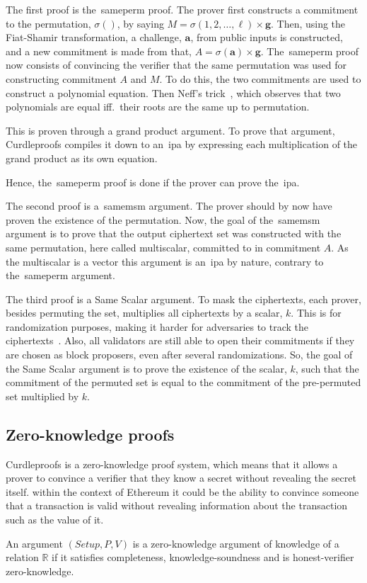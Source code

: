 The first proof is the~\gls{sameperm} proof.
The prover first constructs a commitment to the permutation, $\sigma()$, by saying $M=\sigma(1,2,\dots,\ell)\times\mathbf{g}$.
Then, using the Fiat-Shamir transformation, a challenge, $\mathbf{a}$, from public inputs is constructed, and a new commitment is made from that, $A=\sigma(\mathbf{a})\times\mathbf{g}$.
The~\gls{sameperm} proof now consists of convincing the verifier that the same permutation was used for constructing commitment $A$ and $M$.
To do this, the two commitments are used to construct a polynomial equation.
Then Neff's trick~\cite{10.1145/501983.502000}, which observes that two polynomials are equal iff.\ their roots are the same up to permutation.

This is proven through a grand product argument.
To prove that argument, Curdleproofs compiles it down to an~\gls{ipa} by expressing each multiplication of the grand product as its own equation.

Hence, the~\gls{sameperm} proof is done if the prover can prove the~\gls{ipa}.


The second proof is a~\gls{samemsm} argument.
The prover should by now have proven the existence of the permutation.
Now, the goal of the~\gls{samemsm} argument is to prove that the output ciphertext set was constructed with the same permutation, here called multiscalar, committed to in commitment $A$.
As the multiscalar is a vector this argument is an~\gls{ipa} by nature, contrary to the~\gls{sameperm} argument.

The third proof is a Same Scalar argument.
To mask the ciphertexts, each prover, besides permuting the set, multiplies all ciphertexts by a scalar, $k$.
This is for randomization purposes, making it harder for adversaries to track the ciphertexts~\cite{Whisk2024}.
Also, all validators are still able to open their commitments if they are chosen as block proposers, even after several randomizations.
So, the goal of the Same Scalar argument is to prove the existence of the scalar, $k$, such that the commitment of the permuted set is equal to the commitment of the pre-permuted set multiplied by $k$.



\subsection{Zero-knowledge proofs}\label{sec:background-zkps}
Curdleproofs is a zero-knowledge proof system, which means that it allows a prover to convince a verifier that they know a secret without revealing the secret itself.
within the context of Ethereum it could be the ability to convince someone that a transaction is valid without revealing information about the transaction such as the value of it.

\begin{definition}
    An argument $(Setup, P, V)$ is a zero-knowledge argument of knowledge of a relation $\mathbb{R}$ if it satisfies completeness, knowledge-soundness and is honest-verifier zero-knowledge.
\end{definition}

